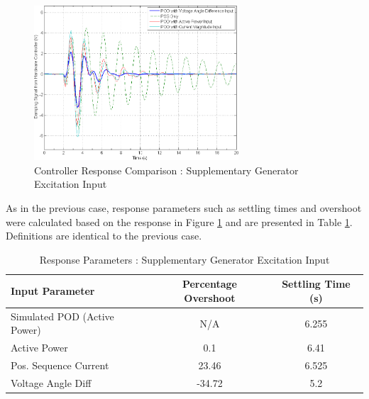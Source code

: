 \documentclass[journal]{IEEEtran}
\begin{document}
\begin{figure}[!th]
\centering
\includegraphics[width=3in]{Wide_Area_ResponseComparison_SamePlot.png}
\caption{Controller Response Comparison : Supplementary Generator Excitation Input}
\label{Generator_Plots}
\end{figure}

As in the previous case, response parameters such as settling times and overshoot were calculated based on the response in Figure \ref{Generator_Plots} and are presented in Table \ref{GENResponseTable}. Definitions are identical to the previous case.\\

\begin{table}[!ht]
\caption{Response Parameters : Supplementary Generator Excitation Input}\label{GENResponseTable}
\begin{center}
\begin{tabular}{|l|c|c|}
\hline \textbf{Input Parameter} & \textbf{Percentage Overshoot} & \textbf{Settling Time (s)} \\
\hline Simulated POD (Active Power) & N/A & 6.255\\ 
\hline Active Power & 0.1 & 6.41\\ 
\hline Pos. Sequence Current & 23.46 & 6.525 \\ 
\hline Voltage Angle Diff & -34.72 & 5.2 \\ 
\hline 
\end{tabular}
\end{center}
\end{table}  

\end{document}
